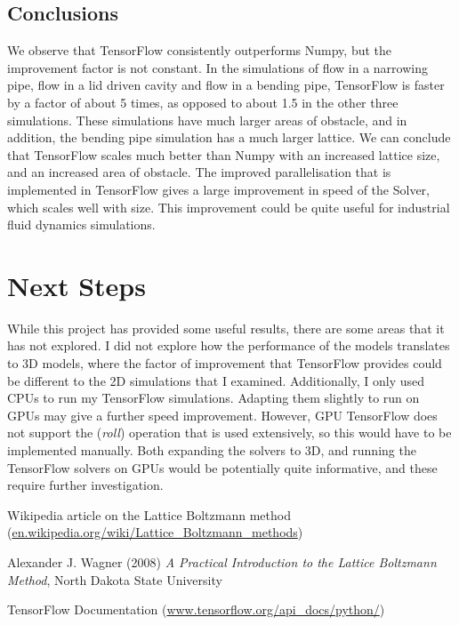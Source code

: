 \documentclass{article}
\begin{document}
\subsection{Conclusions}

We observe that TensorFlow consistently outperforms Numpy, but the improvement factor is not constant. In the simulations of flow in a narrowing pipe, flow in a lid driven cavity and flow in a bending pipe, TensorFlow is faster by a factor of about 5 times, as opposed to about 1.5 in the other three simulations. These simulations have much larger areas of obstacle, and in addition, the bending pipe simulation has a much larger lattice. We can conclude that TensorFlow scales much better than Numpy with an increased lattice size, and an increased area of obstacle. The improved parallelisation that is implemented in TensorFlow gives a large improvement in speed of the Solver, which scales well with size. This improvement could be quite useful for industrial fluid dynamics simulations.

\section{Next Steps}

While this project has provided some useful results, there are some areas that it has not explored. I did not explore how the performance of the models translates to 3D models, where the factor of improvement that TensorFlow provides could be different to the 2D simulations that I examined. Additionally, I only used CPUs to run my TensorFlow simulations. Adapting them slightly to run on GPUs may give a further speed improvement. However, GPU TensorFlow does not support the (\emph{roll}) operation that is used extensively, so this would have to be implemented manually. Both expanding the solvers to 3D, and running the TensorFlow solvers on GPUs would be potentially quite informative, and these require further investigation.

\begin{thebibliography}{99}

 Wikipedia article on the Lattice Boltzmann method (\url{en.wikipedia.org/wiki/Lattice_Boltzmann_methods})

 Alexander J. Wagner (2008) \emph{A Practical Introduction to the Lattice Boltzmann Method}, North Dakota State University

 TensorFlow Documentation (\url{www.tensorflow.org/api_docs/python/})

\end{thebibliography}
\end{document}
